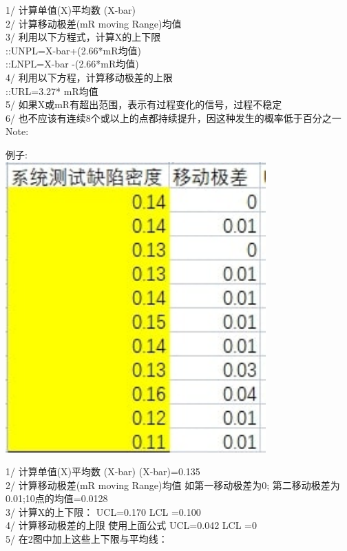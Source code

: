 1/ 计算单值(X)平均数 (X-bar)\\
2/ 计算移动极差(mR moving Range)均值\\
3/ 利用以下方程式，计算X的上下限\\
::UNPL=X-bar+(2.66*mR均值)\\
::LNPL=X-bar -(2.66*mR均值)\\
4/ 利用以下方程，计算移动极差的上限\\
::URL=3.27* mR均值\\
5/ 如果X或mR有超出范围，表示有过程变化的信号，过程不稳定\\
6/ 也不应该有连续8个或以上的点都持续提升，因这种发生的概率低于百分之一\\
Note:

\begin{description}
\item[]
\end{description}

例子:\\


\includegraphics[width=10cm]{微信截图_20210929131748.jpg}

1/ 计算单值(X)平均数 (X-bar) (X-bar)=0.135\\
2/ 计算移动极差(mR moving Range)均值 如第一移动极差为0;
第二移动极差为0.01;10点的均值=0.0128\\
3/ 计算X的上下限： UCL=0.170 LCL =0.100\\
4/ 计算移动极差的上限 使用上面公式 UCL=0.042 LCL =0\\
5/ 在2图中加上这些上下限与平均线：


